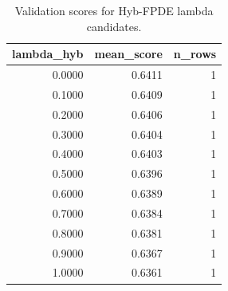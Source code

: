 \begin{table}[t]
\caption{Validation scores for Hyb-FPDE lambda candidates.}
\label{tab:lambda_distribution_computed}
\centering
\begin{tabular}{rrr}
\toprule
lambda\_hyb & mean\_score & n\_rows \\
\midrule
0.0000 & 0.6411 & 1 \\
0.1000 & 0.6409 & 1 \\
0.2000 & 0.6406 & 1 \\
0.3000 & 0.6404 & 1 \\
0.4000 & 0.6403 & 1 \\
0.5000 & 0.6396 & 1 \\
0.6000 & 0.6389 & 1 \\
0.7000 & 0.6384 & 1 \\
0.8000 & 0.6381 & 1 \\
0.9000 & 0.6367 & 1 \\
1.0000 & 0.6361 & 1 \\
\bottomrule
\end{tabular}

\end{table}

